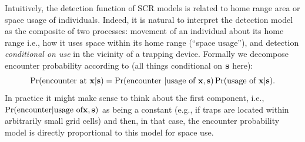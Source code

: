 Intuitively, the detection function of SCR models is related to home
range area or space usage of individuals.  Indeed, it is natural
to interpret the detection model as the composite of two processes:
movement of an individual about its home range i.e., how it uses space
within its home range (``space usage''), and detection {\it
  conditional on use} in the vicinity of a trapping device.
Formally we decompose encounter probability according
to (all things conditional on ${\bf s}$ here):
\[
 \Pr(\mbox{encounter at } {\bf x}|{\bf s})
 = \Pr(\mbox{encounter } | \mbox{usage of } {\bf x}, {\bf s}) 
\Pr(\mbox{usage of } {\bf x}|{\bf s}).
\]
In practice it might make sense to think about the first component,
i.e., $\Pr(\mbox{encounter} | \mbox{usage of} {\bf x}, {\bf s})$ as
being a constant (e.g., if traps are located within arbitrarily small
grid cells) and then, in that case, the encounter probability model is
directly proportional to this model for space use.

